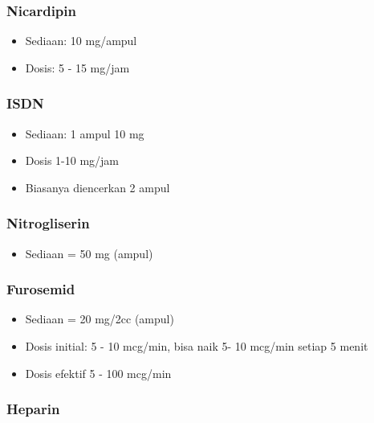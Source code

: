 \documentclass[
]{book}
\providecommand{\tightlist}{%
  \setlength{\itemsep}{0pt}\setlength{\parskip}{0pt}}
\begin{document}
\hypertarget{nicardipin}{%
\subsubsection{Nicardipin}\label{nicardipin}}

\begin{itemize}
\tightlist
\item
  Sediaan: 10 mg/ampul
\item
  Dosis: 5 - 15 mg/jam
\end{itemize}

\hypertarget{isdn}{%
\subsubsection{ISDN}\label{isdn}}

\begin{itemize}
\tightlist
\item
  Sediaan: 1 ampul 10 mg
\item
  Dosis 1-10 mg/jam
\item
  Biasanya diencerkan 2 ampul
\end{itemize}

\hypertarget{nitrogliserin}{%
\subsubsection{Nitrogliserin}\label{nitrogliserin}}

\begin{itemize}
\tightlist
\item
  Sediaan = 50 mg (ampul)
\end{itemize}

\hypertarget{furosemid}{%
\subsubsection{Furosemid}\label{furosemid}}

\begin{itemize}
\tightlist
\item
  Sediaan = 20 mg/2cc (ampul)
\item
  Dosis initial: 5 - 10 mcg/min, bisa naik 5- 10 mcg/min setiap 5 menit
\item
  Dosis efektif 5 - 100 mcg/min
\end{itemize}

\hypertarget{heparin}{%
\subsubsection{Heparin}\label{heparin}}
\end{document}
